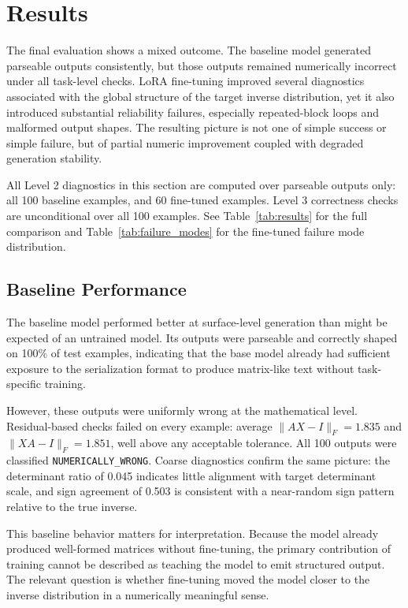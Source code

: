\section{Results}
\label{sec:experiments}

The final evaluation shows a mixed outcome. The baseline model generated parseable outputs consistently, but those outputs remained numerically incorrect under all task-level checks. LoRA fine-tuning improved several diagnostics associated with the global structure of the target inverse distribution, yet it also introduced substantial reliability failures, especially repeated-block loops and malformed output shapes. The resulting picture is not one of simple success or simple failure, but of partial numeric improvement coupled with degraded generation stability.

All Level 2 diagnostics in this section are computed over parseable outputs only: all 100 baseline examples, and 60 fine-tuned examples. Level 3 correctness checks are unconditional over all 100 examples. See Table~\ref{tab:results} for the full comparison and Table~\ref{tab:failure_modes} for the fine-tuned failure mode distribution.

\subsection{Baseline Performance}

The baseline model performed better at surface-level generation than might be expected of an untrained model. Its outputs were parseable and correctly shaped on 100\% of test examples, indicating that the base model already had sufficient exposure to the serialization format to produce matrix-like text without task-specific training.

However, these outputs were uniformly wrong at the mathematical level. Residual-based checks failed on every example: average $\|AX - I\|_F = 1.835$ and $\|XA - I\|_F = 1.851$, well above any acceptable tolerance. All 100 outputs were classified \texttt{NUMERICALLY\_WRONG}. Coarse diagnostics confirm the same picture: the determinant ratio of 0.045 indicates little alignment with target determinant scale, and sign agreement of 0.503 is consistent with a near-random sign pattern relative to the true inverse.

This baseline behavior matters for interpretation. Because the model already produced well-formed matrices without fine-tuning, the primary contribution of training cannot be described as teaching the model to emit structured output. The relevant question is whether fine-tuning moved the model closer to the inverse distribution in a numerically meaningful sense.

